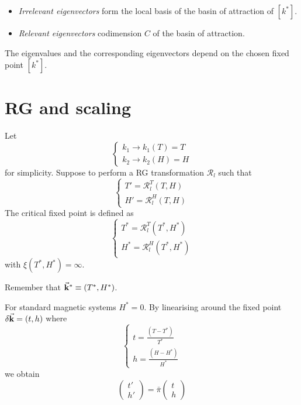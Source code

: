 \documentclass[../main/main.tex]{subfiles}
\begin{document}
\begin{itemize}
\item \emph{Irrelevant eigenvectors} form the local basis of the basin of attraction of \( [k^*] \).
\item \emph{Relevant eigenvectors} codimension \( C \) of the basin of attraction.
\end{itemize}
\begin{remark}
The eigenvalues and the corresponding eigenvectors depend on the chosen fixed point \( [k^*] \).
\end{remark}

\section{RG and scaling}
Let
\begin{equation}
  \begin{cases}
   k_1 \rightarrow k_1 (T) = T\\
   k_2 \rightarrow k_2 (H) = H
  \end{cases}
\end{equation}
for simplicity. Suppose to perform a RG transformation \( \mathcal{R}_l \) such that
\begin{equation}
  \begin{cases}
   T' = \mathcal{R}_l ^T (T,H) \\
   H' = \mathcal{R}_l ^H (T,H)
  \end{cases}
\end{equation}
The critical fixed point is defined as
\begin{equation}
  \begin{cases}
   T^* = \mathcal{R}_l ^T (T^*,H^*)\\
   H^* = \mathcal{R}_l ^H (T^*,H^*)
  \end{cases}
\end{equation}
with \( \xi (T^*,H^*) = \infty  \).
\begin{remark}
Remember that \( \va{k}^* \equiv (T^*,H^*) \).
\end{remark}
For standard magnetic systems \( H^*=0 \). By linearising around the fixed point
\( \delta \va{k}= (t,h) \)  where
\begin{equation}
  \begin{cases}
   t = \frac{(T-T^*)}{T^*}\\
   h = \frac{(H-H^*)}{H^*}
  \end{cases}
\end{equation}
we obtain
\begin{equation}
  \begin{pmatrix}
  t' \\
  h'
  \end{pmatrix}
  = \bar{\pi }
  \begin{pmatrix}
  t \\
  h
  \end{pmatrix}
\end{equation}
\end{document}
